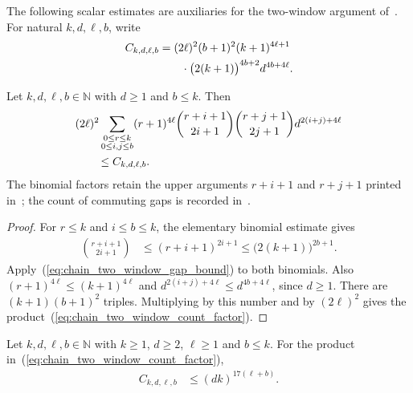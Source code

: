 The following scalar estimates are auxiliaries for the two-window argument
of~\cite[Proposition~5.7]{Arad2016RigorousRG}. For natural
$k,d,\ell,b$, write
\begin{align}
    C_{k,d,\ell,b}
     & =(2\ell)^2(b+1)^2(k+1)^{4\ell+1}\notag            \\
     & \qquad\cdot\bigl(2(k+1)\bigr)^{4b+2}d^{4b+4\ell}.
    \label{eq:chain_two_window_count_factor}
\end{align}

\begin{lemma}
    \label{thm:chain_two_window_count_sum}
    \leanok
    Let $k,d,\ell,b\in\mathbb N$ with $d\ge1$ and $b\le k$. Then
    \begin{align}
         & (2\ell)^2
        \sum_{\substack{0\le r\le k                    \\0\le i,j\le b}}
        (r+1)^{4\ell}
        \binom{r+i+1}{2i+1}\binom{r+j+1}{2j+1}
        d^{2(i+j)+4\ell}\notag       \\
         & \qquad\le C_{k,d,\ell,b}.
        \label{eq:chain_two_window_count_sum}
    \end{align}
    The binomial factors retain the upper arguments
    $r+i+1$ and $r+j+1$ printed in~\cite[Proposition~5.7]{Arad2016RigorousRG};
    the count of commuting gaps is recorded
    in~\cite{gap:aklv13_interpolation_and_word_count}.
\end{lemma}

\begin{proof}\leanok
    For $r\le k$ and $i\le b\le k$, the elementary binomial estimate gives
    \begin{align}
        \binom{r+i+1}{2i+1}
         & \le (r+i+1)^{2i+1}
        \le\bigl(2(k+1)\bigr)^{2b+1}.
        \label{eq:chain_two_window_gap_bound}
    \end{align}
    Apply~(\ref{eq:chain_two_window_gap_bound}) to both binomials.
    Also $(r+1)^{4\ell}\le(k+1)^{4\ell}$ and
    $d^{2(i+j)+4\ell}\le d^{4b+4\ell}$, since $d\ge1$.
    There are $(k+1)(b+1)^2$ triples. Multiplying by this number and by
    $(2\ell)^2$ gives the product~(\ref{eq:chain_two_window_count_factor}).
\end{proof}

\begin{lemma}
    \label{thm:chain_two_window_count_power}
    \leanok
    Let $k,d,\ell,b\in\mathbb N$ with $k\ge1$, $d\ge2$,
    $\ell\ge1$ and $b\le k$. For the product
    in~(\ref{eq:chain_two_window_count_factor}),
    \begin{align}
        C_{k,d,\ell,b}
         & \le(dk)^{17(\ell+b)}.
        \label{eq:chain_two_window_count_power}
    \end{align}
\end{lemma}

